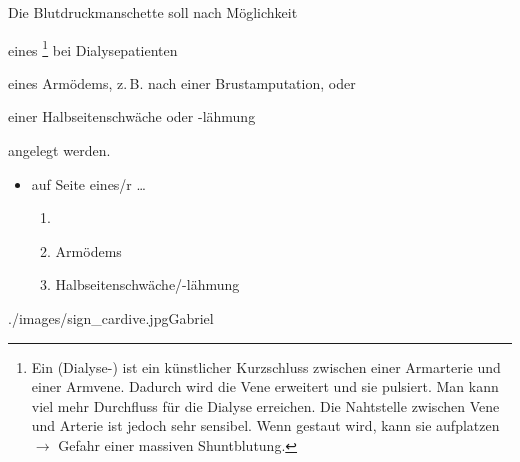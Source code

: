 {%
Die Blutdruckmanschette soll nach Möglichkeit 
\begin{inparaenum}
  \item eines \footnote{Ein
  (Dialyse-) ist ein künstlicher Kurzschluss
  zwischen einer Armarterie und einer Armvene. Dadurch wird
  die Vene erweitert und sie pulsiert. Man kann viel mehr
  Durchfluss für die Dialyse erreichen. Die Nahtstelle
  zwischen Vene und Arterie ist jedoch sehr sensibel. Wenn
  gestaut wird, kann sie aufplatzen $\rightarrow$ Gefahr
  einer massiven Shuntblutung.} bei Dialysepatienten \item
  eines Armödems, z.\,B. nach einer Brustamputation, oder
  \item einer Halbseitenschwäche oder -lähmung
\end{inparaenum}
angelegt werden.

}{
\begin{itemize}
  \item {} auf Seite eines/r \dots{}
  \begin{enumerate}
    \item {}
    \item Armödems
    \item Halbseitenschwäche/-lähmung
  \end{enumerate}
\end{itemize}

}{./images/sign_cardive.jpg}{}{Gabriel}






